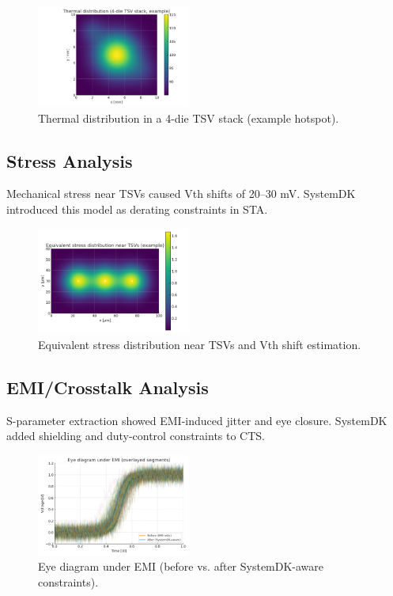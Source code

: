\documentclass[conference]{IEEEtran}
\begin{document}
\begin{figure}[htbp]
  \centering
  \includegraphics[width=0.45\textwidth]{figures/thermal_map.png}
  \caption{Thermal distribution in a 4-die TSV stack (example hotspot).}
  \label{fig:thermal}
\end{figure}

\subsection{Stress Analysis}
Mechanical stress near TSVs caused Vth shifts of 20--30 mV.  
SystemDK introduced this model as derating constraints in STA.  

\begin{figure}[htbp]
  \centering
  \includegraphics[width=0.45\textwidth]{figures/stress_map.png}
  \caption{Equivalent stress distribution near TSVs and Vth shift estimation.}
  \label{fig:stress}
\end{figure}

\subsection{EMI/Crosstalk Analysis}
S-parameter extraction showed EMI-induced jitter and eye closure.  
SystemDK added shielding and duty-control constraints to CTS.  

\begin{figure}[htbp]
  \centering
  \includegraphics[width=0.45\textwidth]{figures/eye_diagram.png}
  \caption{Eye diagram under EMI (before vs. after SystemDK-aware constraints).}
  \label{fig:eye}
\end{figure}
\end{document}
